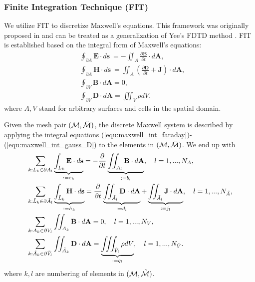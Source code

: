 \documentclass{article}
\begin{document}
\subsubsection{Finite Integration Technique (FIT)}
We utilize FIT to discretize Maxwell's equations. This framework was originally proposed in \cite{weiland_1977} and can be treated as a generalization of Yee's FDTD method \cite{yee_1966}. FIT is established based on the integral form of Maxwell's equations:
\begin{subequations}
\begin{align}
    &\oint_{\partial A} \mathbf{E} \cdot d\mathbf{s} \ = - \iint_A \frac{\partial \mathbf{B}}{\partial t} \cdot d\mathbf{A}, \label{equ:maxwell_int_faraday}\\
    &\oint_{\partial A} \mathbf{H} \cdot d\mathbf{s} \ = \iint_A \left(\frac{\partial \mathbf{D}}{\partial t} + \mathbf{J}\right) \cdot d\mathbf{A}, \label{equ:maxwell_int_ampere}\\
    &\oint_{\partial V} \mathbf{B} \cdot d\mathbf{A} = 0, \label{equ:maxwell_int_gauss_B}\\
    &\oint_{\partial V} \mathbf{D} \cdot d\mathbf{A} = \iiint_V \rho dV. \label{equ:maxwell_int_gauss_D}
\end{align}
\end{subequations}
where $A, V$ stand for arbitrary surfaces and cells in the spatial domain. 

Given the mesh pair $(\mathcal{M}, \Tilde{\mathcal{M}})$, the discrete Maxwell system is described by applying the integral equations (\ref{equ:maxwell_int_faraday})-(\ref{equ:maxwell_int_gauss_D}) to the elements in $(\mathcal{M}, \Tilde{\mathcal{M}})$. We end up with
\begin{subequations}
\begin{align}
    &\sum_{k:L_k\in\partial A_l} \underbrace{\int_{L_k} \mathbf{E} \cdot d\mathbf{s}}_{:= e_k} = - \frac{\partial}{\partial t} \underbrace{\iint_{A_l} \mathbf{B} \cdot d\mathbf{A}}_{:= b_l},\ \ \ l = 1,...,N_A, \label{equ:maxwell_grid_faraday} \\
    &\sum_{k:\Tilde{L}_k\in\partial \Tilde{A}_l} \underbrace{\int_{\Tilde{L}_k} \mathbf{H} \cdot d\mathbf{s}}_{:= h_k} = \frac{\partial}{\partial t} \underbrace{\iint_{\Tilde{A}_l} \mathbf{D} \cdot d\mathbf{A}}_{:= d_l} + \underbrace{\iint_{\Tilde{A}_l} \mathbf{J} \cdot d\mathbf{A}}_{:= j_l}, \ \ \ l = 1,...,N_{\Tilde{A}}, \label{equ:maxwell_grid_ampere}\\
    &\sum_{k:A_k\in \partial V_l} \iint_{A_k} \mathbf{B} \cdot d\mathbf{A} = 0,\ \ \ l = 1,..., N_V,\label{equ:maxwell_grid_gauss_B}\\
    &\sum_{k:\Tilde{A}_k \in \partial\Tilde{V}_l}\iint_{\Tilde{A}_k} \mathbf{D} \cdot d\mathbf{A} = \underbrace{\iiint_{\Tilde{V}_l} \rho dV}_{:= q_l},\ \ \ l = 1,...,N_{\Tilde{V}}. \label{equ:maxwell_grid_gauss_D}
\end{align}
\end{subequations}
where $k, l$ are numbering of elements in $(\mathcal{M}, \Tilde{\mathcal{M}})$.
\end{document}
